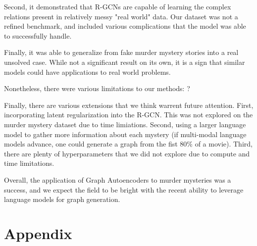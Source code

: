 \documentclass[11pt]{article}
\begin{document}
    Second, it demonstrated that R-GCNs are capable of learning the complex relations present in relatively messy "real world" data. Our dataset was not a refined benchmark, and included various complications that the model was able to successfully handle.

    Finally, it was able to generalize from fake murder mystery stories into a real unsolved case. While not a significant result on its own, it is a sign that similar models could have applications to real world problems.


    Nonetheless, there were various limitations to our methods:
    ?

    Finally, there are various extensions that we think warrent future attention.
    First, incorporating latent regularization into the R-GCN. This was not explored on the murder mystery dataset due to time limiations.
    Second, using a larger language model to gather more information about each mystery (if multi-modal language models advance, one could generate a graph from the fist 80\% of a movie).
    Third, there are plenty of hyperparameters that we did not explore due to compute and time limitations.

    Overall, the application of Graph Autoencoders to murder mysteries was a success, and we expect the field to be bright with the recent ability to leverage language models for graph generation.

\section{Appendix}






\end{document}
